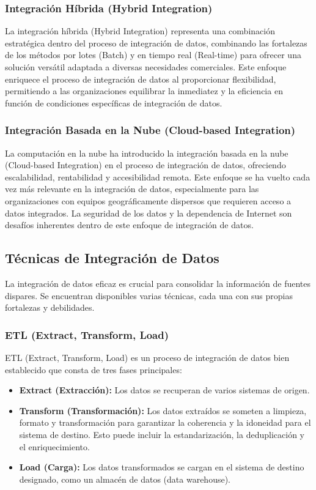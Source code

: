 \documentclass[12pt]{book}
\begin{document}
\subsubsection{Integración Híbrida (Hybrid Integration)}
La integración híbrida (Hybrid Integration) representa una combinación estratégica dentro del proceso de integración de datos, combinando las fortalezas de los métodos por lotes (Batch) y en tiempo real (Real-time) para ofrecer una solución versátil adaptada a diversas necesidades comerciales. Este enfoque enriquece el proceso de integración de datos al proporcionar flexibilidad, permitiendo a las organizaciones equilibrar la inmediatez y la eficiencia en función de condiciones específicas de integración de datos.

\subsubsection{Integración Basada en la Nube (Cloud-based Integration)}
La computación en la nube ha introducido la integración basada en la nube (Cloud-based Integration) en el proceso de integración de datos, ofreciendo escalabilidad, rentabilidad y accesibilidad remota. Este enfoque se ha vuelto cada vez más relevante en la integración de datos, especialmente para las organizaciones con equipos geográficamente dispersos que requieren acceso a datos integrados. La seguridad de los datos y la dependencia de Internet son desafíos inherentes dentro de este enfoque de integración de datos.

\subsection{Técnicas de Integración de Datos}

La integración de datos eficaz es crucial para consolidar la información de fuentes dispares. Se encuentran disponibles varias técnicas, cada una con sus propias fortalezas y debilidades.

\subsubsection{ETL (Extract, Transform, Load)}

ETL (Extract, Transform, Load) es un proceso de integración de datos bien establecido que consta de tres fases principales:

\begin{itemize}
    \item \textbf{Extract (Extracción):} Los datos se recuperan de varios sistemas de origen.
    \item \textbf{Transform (Transformación):} Los datos extraídos se someten a limpieza, formato y transformación para garantizar la coherencia y la idoneidad para el sistema de destino. Esto puede incluir la estandarización, la deduplicación y el enriquecimiento.
    \item \textbf{Load (Carga):} Los datos transformados se cargan en el sistema de destino designado, como un almacén de datos (data warehouse).
\end{itemize}
\end{document}
